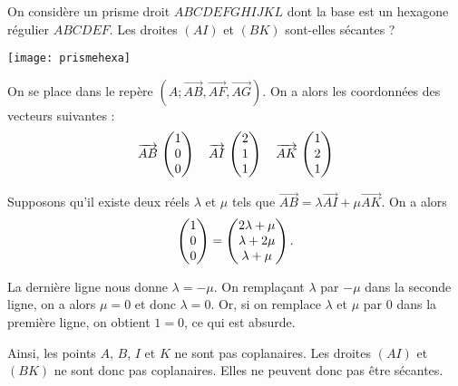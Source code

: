 \documentclass[11pt,fleqn, openany]{book} %
\begin{document}
\begin{exercise}On considère un prisme droit $ABCDEFGHIJKL$ dont la base est un hexagone régulier $ABCDEF$. Les droites $(AI)$ et $(BK)$ sont-elles sécantes ?
 \begin{center}
\texttt{[image: prismehexa]}
\end{center}
\end{exercise}
\begin{solution}
On se place dans le repère $(A;\overrightarrow{AB},\overrightarrow{AF},\overrightarrow{AG})$. On a alors les coordonnées des vecteurs suivantes :
\[ \coorde{AB}{1}{0}{0} \quad \coorde{AI}{2}{1}{1} \quad \coorde{AK}{1}{2}{1}\]

Supposons qu'il existe deux réels $\lambda$ et $\mu$ tels que $\overrightarrow{AB}=\lambda \overrightarrow{AI}+\mu \overrightarrow{AK}$. On a alors
\[ \coordbe{1}{0}{0}=\coordbe{2\lambda + \mu}{\lambda + 2\mu}{\lambda + \mu}.\]

La dernière ligne nous donne $\lambda = -\mu$. On remplaçant $\lambda$ par $-\mu$ dans la seconde ligne, on a alors $\mu=0$ et donc $\lambda = 0$. Or, si on remplace $\lambda$ et $\mu$ par 0 dans la première ligne, on obtient $1=0$, ce qui est absurde.

Ainsi, les points $A$, $B$, $I$ et $K$ ne sont pas coplanaires. Les droites $(AI)$ et $(BK)$ ne sont donc pas coplanaires. Elles ne peuvent donc pas être sécantes.\end{solution}
\end{document}
